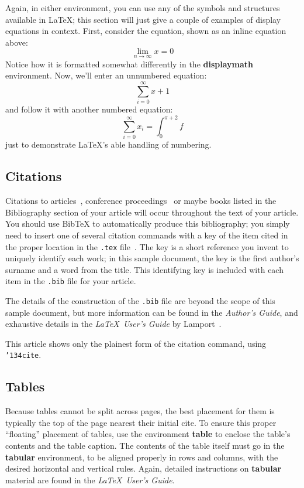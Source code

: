 Again, in either environment, you can use any of the symbols
and structures available in \LaTeX\@; this section will just
give a couple of examples of display equations in context.
First, consider the equation, shown as an inline equation above:
\begin{equation}
  \lim_{n\rightarrow \infty}x=0
\end{equation}
Notice how it is formatted somewhat differently in
the \textbf{displaymath}
environment.  Now, we'll enter an unnumbered equation:
\begin{displaymath}
  \sum_{i=0}^{\infty} x + 1
\end{displaymath}
and follow it with another numbered equation:
\begin{equation}
  \sum_{i=0}^{\infty}x_i=\int_{0}^{\pi+2} f
\end{equation}
just to demonstrate \LaTeX's able handling of numbering.

\subsection{Citations}
Citations to articles~\cite{bowman:reasoning,
clark:pct, braams:babel, herlihy:methodology},
conference proceedings~\cite{clark:pct} or maybe
books \cite{Lamport:LaTeX, salas:calculus} listed
in the Bibliography section of your
article will occur throughout the text of your article.
You should use BibTeX to automatically produce this bibliography;
you simply need to insert one of several citation commands with
a key of the item cited in the proper location in
the \texttt{.tex} file~\cite{Lamport:LaTeX}.
The key is a short reference you invent to uniquely
identify each work; in this sample document, the key is
the first author's surname and a
word from the title.  This identifying key is included
with each item in the \texttt{.bib} file for your article.

The details of the construction of the \texttt{.bib} file
are beyond the scope of this sample document, but more
information can be found in the \textit{Author's Guide},
and exhaustive details in the \textit{\LaTeX\ User's
Guide} by Lamport~.


This article shows only the plainest form
of the citation command, using \texttt{{\char'134}cite}.

\subsection{Tables}
Because tables cannot be split across pages, the best
placement for them is typically the top of the page
nearest their initial cite.  To
ensure this proper ``floating'' placement of tables, use the
environment \textbf{table} to enclose the table's contents and
the table caption.  The contents of the table itself must go
in the \textbf{tabular} environment, to
be aligned properly in rows and columns, with the desired
horizontal and vertical rules.  Again, detailed instructions
on \textbf{tabular} material
are found in the \textit{\LaTeX\ User's Guide}.

